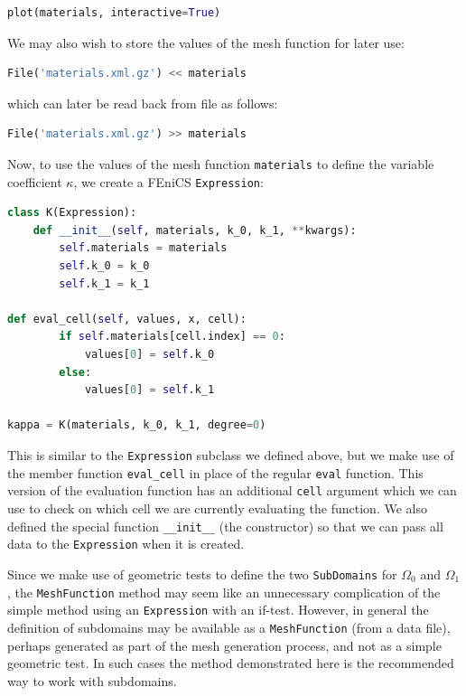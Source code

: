 \documentclass[graybox,envcountchap,sectrefs,final]{svmonodo}
\begin{document}
\begin{lstlisting}[language=Python,style=graycolor]
plot(materials, interactive=True)
\end{lstlisting}
We may also wish to store the values of the mesh function for later
use:
\begin{lstlisting}[language=Python,style=graycolor]
File('materials.xml.gz') << materials
\end{lstlisting}
which can later be read back from file as follows:
\begin{lstlisting}[language=Python,style=graycolor]
File('materials.xml.gz') >> materials
\end{lstlisting}

Now, to use the values of the mesh function \texttt{materials} to define the
variable coefficient $\kappa$, we create a FEniCS \texttt{Expression}:

\begin{lstlisting}[language=Python,style=graycolor]
class K(Expression):
    def __init__(self, materials, k_0, k_1, **kwargs):
        self.materials = materials
        self.k_0 = k_0
        self.k_1 = k_1

def eval_cell(self, values, x, cell):
        if self.materials[cell.index] == 0:
            values[0] = self.k_0
        else:
            values[0] = self.k_1

kappa = K(materials, k_0, k_1, degree=0)
\end{lstlisting}

This is similar to the \texttt{Expression} subclass we defined above, but we
make use of the member function \Verb!eval_cell! in place of the regular
\texttt{eval} function. This version of the evaluation function has an
additional \texttt{cell} argument which we can use to check on which cell we
are currently evaluating the function.  We also defined the special
function \Verb!__init__! (the constructor) so that we can pass all data to
the \texttt{Expression} when it is created.

Since we make use of geometric tests to define the two \texttt{SubDomains}
for $\Omega_0$ and $\Omega_1$, the \texttt{MeshFunction} method may seem like
an unnecessary complication of the simple method using an
\texttt{Expression} with an if-test. However, in general the definition of
subdomains may be available as a \texttt{MeshFunction} (from a data file),
perhaps generated as part of the mesh generation process, and not as a
simple geometric test. In such cases the method demonstrated here is
the recommended way to work with subdomains.
\end{document}
